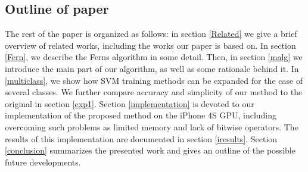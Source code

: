 \documentclass[10pt,twocolumn, a4paper]{article}
\begin{document}
\subsection{Outline of paper}
\label{Outline}
The rest of the paper is organized as follows: in section \ref{Related} we give a brief overview of related works, including the works our paper is based on.  In  section \ref{Fern}, we describe the Ferns algorithm in some detail. Then, in section \ref{malg} we introduce the main part of our algorithm, as well as some rationale behind it. In \ref{multiclass}, we show how SVM training methods can be expanded for the case of several classes. We further compare accuracy and simplicity of our method to the original in section \ref{exp1}.  Section \ref{implementation} is devoted to our implementation of the proposed method on the iPhone 4S GPU, including overcoming such problems as limited memory and lack of bitwise operators.  The results of this implementation are documented in section \ref{iresults}.
Section \ref{conclusion} summarizes the presented work and gives an outline of the possible future developments.
\end{document}
